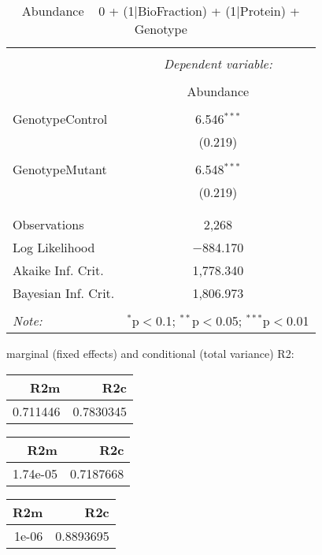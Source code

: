 \documentclass[11pt]{report}
\begin{document}
\begin{table}[!htbp] \centering 
  \caption{Abundance ~ 0 + (1|BioFraction) + (1|Protein) + Genotype} 
  \label{} 
\begin{tabular}{@{\extracolsep{5pt}}lc} 
\\[-1.8ex]\hline 
\hline \\[-1.8ex] 
 & \multicolumn{1}{c}{\textit{Dependent variable:}} \\ 
\cline{2-2} 
\\[-1.8ex] & Abundance \\ 
\hline \\[-1.8ex] 
 GenotypeControl & 6.546$^{***}$ \\ 
  & (0.219) \\ 
  & \\ 
 GenotypeMutant & 6.548$^{***}$ \\ 
  & (0.219) \\ 
  & \\ 
\hline \\[-1.8ex] 
Observations & 2,268 \\ 
Log Likelihood & $-$884.170 \\ 
Akaike Inf. Crit. & 1,778.340 \\ 
Bayesian Inf. Crit. & 1,806.973 \\ 
\hline 
\hline \\[-1.8ex] 
\textit{Note:}  & \multicolumn{1}{r}{$^{*}$p$<$0.1; $^{**}$p$<$0.05; $^{***}$p$<$0.01} \\ 
\end{tabular} 
\end{table} 
marginal (fixed effects) and conditional (total variance) R2:

\begin{tabular}{r|r}
\hline
R2m & R2c\\
\hline
0.711446 & 0.7830345\\
\hline
\end{tabular}

\begin{tabular}{r|r}
\hline
R2m & R2c\\
\hline
1.74e-05 & 0.7187668\\
\hline
\end{tabular}

\begin{tabular}{r|r}
\hline
R2m & R2c\\
\hline
1e-06 & 0.8893695\\
\hline
\end{tabular}
\end{document}
